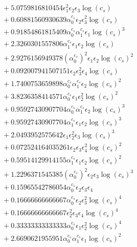 \documentclass[10pt]{article}
\begin{document}
\begin{align*}
&{}  + 5.0759816810454 \epsilon_{1}^{2} \epsilon_{2} \epsilon_{3} \log{\left(c_{s} \right)} \\
&{}  + 0.60881560930639 \alpha_{0}^{c_s} \epsilon_{2} \epsilon_{3}^{2} \log{\left(c_{s} \right)} \\
&{}  + 0.91854861815409 \alpha_{0}^{c_s} \alpha_{1}^{c_s} \epsilon_{1} \log{\left(c_{s} \right)}^{3} \\
&{}  + 2.3260301557806 \alpha_{1}^{c_s} \epsilon_{1} \epsilon_{2} \log{\left(c_{s} \right)} \\
&{}  + 2.9276156949378 \left(\alpha_{0}^{c_s}\right)^{2} \epsilon_{1} \epsilon_{2} \log{\left(c_{s} \right)}^{2} \\
&{}  + 0.092007941507151 \epsilon_{2} \epsilon_{3}^{2} \epsilon_{4} \log{\left(c_{s} \right)} \\
&{}  + 1.7400753659898 \alpha_{0}^{c_s} \alpha_{1}^{c_s} \epsilon_{2} \log{\left(c_{s} \right)}^{2} \\
&{}  + 3.8236358414571 \alpha_{0}^{c_s} \epsilon_{1} \epsilon_{2}^{2} \log{\left(c_{s} \right)}^{2} \\
&{}  + 0.95927430907704 \alpha_{0}^{c_s} \alpha_{1}^{c_s} \epsilon_{2} \log{\left(c_{s} \right)}^{3} \\
&{}  + 0.95927430907704 \alpha_{1}^{c_s} \epsilon_{1} \epsilon_{2} \log{\left(c_{s} \right)}^{3} \\
&{}  + 2.0493952575642 \epsilon_{1} \epsilon_{2}^{2} \epsilon_{3} \log{\left(c_{s} \right)}^{3} \\
&{}  + 0.072524164035261 \epsilon_{2} \epsilon_{3} \epsilon_{4}^{2} \log{\left(c_{s} \right)}^{2} \\
&{}  + 0.59514129914155 \alpha_{1}^{c_s} \epsilon_{1} \epsilon_{2} \log{\left(c_{s} \right)}^{2} \\
&{}  + 1.2296371545385 \left(\alpha_{0}^{c_s}\right)^{2} \epsilon_{2} \epsilon_{3} \log{\left(c_{s} \right)}^{3} \\
&{}  + 0.15965542786054 \alpha_{0}^{c_s} \epsilon_{2} \epsilon_{3} \epsilon_{4} \\
&{}  + 0.16666666666667 \alpha_{0}^{c_s} \epsilon_{2} \epsilon_{3}^{2} \log{\left(c_{s} \right)}^{4} \\
&{}  + 0.16666666666667 \epsilon_{2}^{2} \epsilon_{3} \epsilon_{4} \log{\left(c_{s} \right)}^{4} \\
&{}  + 0.33333333333333 \alpha_{0}^{c_s} \epsilon_{1} \epsilon_{2}^{2} \log{\left(c_{s} \right)}^{4} \\
&{}  + 2.6690621955951 \alpha_{0}^{c_s} \alpha_{1}^{c_s} \epsilon_{1} \log{\left(c_{s} \right)}^{2} \\

\end{align*}
\end{document}
